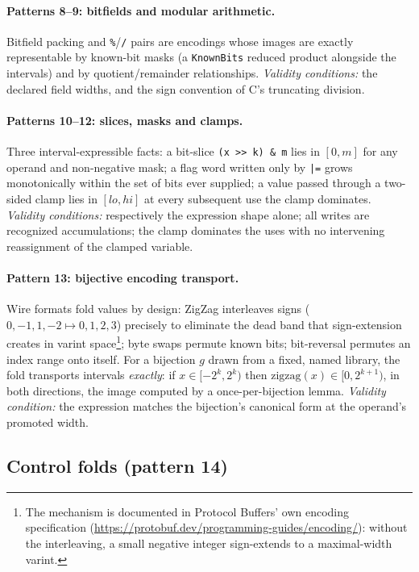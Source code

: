 \documentclass[11pt,a4paper]{article}
\begin{document}
\paragraph{Patterns 8--9: bitfields and modular arithmetic.} Bitfield packing and
\texttt{\%}/\texttt{/} pairs are encodings whose images are exactly representable by
known-bit masks (a \texttt{KnownBits} reduced product alongside the intervals) and by
quotient/remainder relationships. \emph{Validity conditions:} the declared field widths,
and the sign convention of C's truncating division.

\paragraph{Patterns 10--12: slices, masks and clamps.} Three interval-expressible facts:
a bit-slice \texttt{(x >> k) \& m} lies in $[0, m]$ for any operand and non-negative
mask; a flag word written only by \texttt{|=} grows monotonically within the set of bits
ever supplied; a value passed through a two-sided clamp lies in
$[\mathit{lo}, \mathit{hi}]$ at every subsequent use the clamp dominates.
\emph{Validity conditions:} respectively the expression shape alone; all writes are
recognized accumulations; the clamp dominates the uses with no intervening reassignment
of the clamped variable.

\paragraph{Pattern 13: bijective encoding transport.} Wire formats fold values by
design: ZigZag interleaves signs ($0, -1, 1, -2 \mapsto 0, 1, 2, 3$) precisely to
eliminate the dead band that sign-extension creates in varint
space\footnote{The mechanism is documented in Protocol Buffers' own encoding
specification (\url{https://protobuf.dev/programming-guides/encoding/}): without the
interleaving, a small negative integer sign-extends to a maximal-width varint.}; byte swaps permute
known bits; bit-reversal permutes an index range onto itself. For a bijection $g$ drawn
from a fixed, named library, the fold transports intervals \emph{exactly}: if
$x \in [-2^k, 2^k)$ then $\mathrm{zigzag}(x) \in [0, 2^{k+1})$, in both directions, the
image computed by a once-per-bijection lemma. \emph{Validity condition:} the expression
matches the bijection's canonical form at the operand's promoted width.

\subsection{Control folds (pattern 14)}
\end{document}

